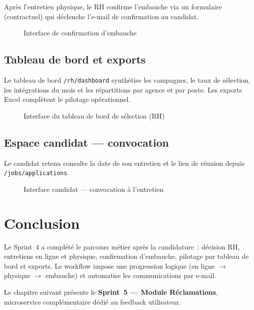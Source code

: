 Après l'entretien physique, le RH confirme l'embauche via un formulaire
(contractuel) qui déclenche l'e-mail de confirmation au candidat.

\begin{figure}[H]
  \centering
  \caption{Interface de confirmation d'embauche}
  \label{fig:ui-hire-modal}
\end{figure}


\subsection{Tableau de bord et exports}

Le tableau de bord \texttt{/rh/dashboard} synthétise les campagnes, le taux
de sélection, les intégrations du mois et les répartitions par agence et
par poste. Les exports Excel complètent le pilotage opérationnel.

\begin{figure}[H]
  \centering
  \caption{Interface du tableau de bord de sélection (RH)}
  \label{fig:ui-dashboard}
\end{figure}


\subsection{Espace candidat --- convocation}

Le candidat retenu consulte la date de son entretien et le lien de réunion
depuis \texttt{/jobs/applications}.

\begin{figure}[H]
  \centering
  \caption{Interface candidat --- convocation à l'entretien}
  \label{fig:ui-candidate-interview}
\end{figure}


\section{Conclusion}

Le Sprint~4 a complété le parcours métier après la candidature~: décision
RH, entretiens en ligne et physique, confirmation d'embauche, pilotage par
tableau de bord et exports. Le workflow impose une progression logique
(en ligne $\rightarrow$ physique $\rightarrow$ embauche) et automatise les
communications par e-mail.

Le chapitre suivant présente le \textbf{Sprint~5 --- Module Réclamations},
microservice complémentaire dédié au feedback utilisateur.

\clearpage
